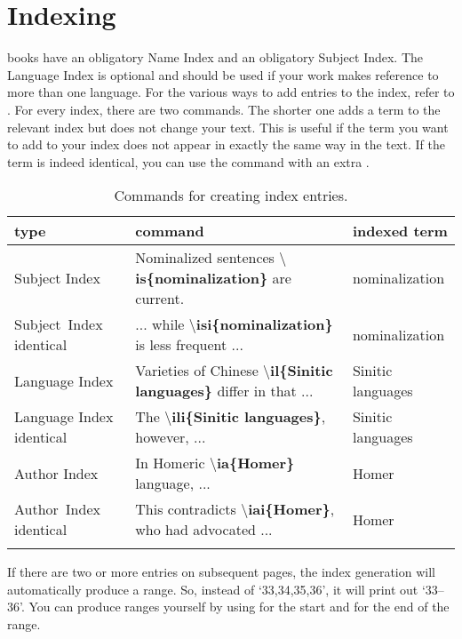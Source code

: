 \chapter{Indexing}
\lsp books have an obligatory Name Index and an obligatory Subject Index. The Language Index is optional and should be used if your work makes reference to more than one language. 
For the various ways to add entries to the index, refer to . For every index, there are two commands. The shorter one adds a term to the relevant index but does not change your text. This is useful if the term you want to add to your index does not appear in exactly the same way in the text. If the term is indeed identical, you can use the command with an extra .

\begin{table}[h]
\caption{Commands for creating index entries.}
\label{tab:latex:indexentriese}
 \begin{tabular}{p{2.5cm}>{\tt\small\raggedright}p{6.5cm}l}
  \lsptoprule
  type & \rm\normalsize command & indexed term \\
  \midrule
  Subject Index& Nominalized sentences \textbf{$\setminus$is\{nominalization\}} are current. & nomina\-lization \\
  \mbox{Subject Index} identical& ... while \textbf{$\setminus$isi\{nominalization\}} is less frequent ...  & nomina\-lization \\[2em]
  Language Index & Varieties of Chinese \textbf{$\setminus$il\{Sinitic languages\}} differ in that ...& Sinitic languages \\
  Language Index identical& The \textbf{$\setminus$ili\{Sinitic languages\}}, \mbox{however}, ... & Sinitic languages \\[2em]
  Author Index & In Homeric \textbf{$\setminus$ia\{Homer\}} language, ...  & Homer\\
  \mbox{Author Index} identical & This contradicts \textbf{$\setminus$iai\{Homer\}}, who had advocated ... & Homer \\
  \lspbottomrule
 \end{tabular}
\end{table}

If there are two or more entries on subsequent pages, the index generation will automatically produce a range. So, instead of `33,34,35,36', it will print out `33--36'. You can produce ranges yourself by using  for the start and   for the end of the range. 

